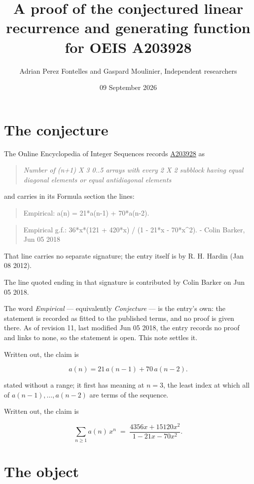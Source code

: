 \documentclass[11pt]{article}
\title{A proof of the conjectured linear recurrence and generating function for OEIS A203928}
\author{Adrian Perez Fontelles and Gaspard Moulinier, Independent researchers}
\date{09 September 2026}
\theoremstyle{definition}
\begin{document}
\maketitle
\section{The conjecture}

The Online Encyclopedia of Integer Sequences records \href{https://oeis.org/A203928}{A203928} as

\begin{quote}\itshape Number of (n+1) X 3 0..5 arrays with every 2 X 2 subblock having equal diagonal elements or equal antidiagonal elements\end{quote}

and carries in its Formula section the lines:

\begin{quote}\ttfamily Empirical: a(n) = 21*a(n-1) + 70*a(n-2).\end{quote}

\begin{quote}\ttfamily Empirical g.f.: 36*x*(121 + 420*x) / (1 - 21*x - 70*x\textasciicircum{}2). - Colin Barker, Jun 05 2018\end{quote}

That line carries no separate signature; the entry itself is by R. H. Hardin (Jan 08 2012).

The line quoted ending in that signature is contributed by Colin Barker on Jun 05 2018.

The word {\itshape Empirical} --- equivalently {\itshape Conjecture} --- is the entry's own: the statement is recorded as fitted to the published terms, and no proof is given there. As of revision 11, last modified Jun 05 2018, the entry records no proof and links to none, so the statement is open. This note settles it.

Written out, the claim is

\[a(n) = 21\,a(n-1) + 70\,a(n-2).\]

stated without a range; it first has meaning at $n = 3$, the least index at which all of $a(n-1),\dots,a(n-2)$ are terms of the sequence.

Written out, the claim is

\[\sum_{n \ge 1} a(n)\,x^n \;=\; \frac{4356x + 15120x^{2}}{1 - 21x - 70x^{2}}.\]

\section{The object}
\end{document}

